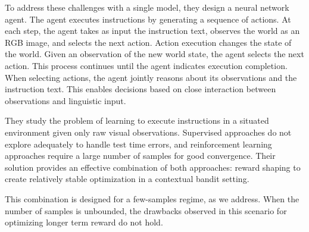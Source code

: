 To address these challenges with a single model, they design a neural network agent. The agent executes instructions by generating a sequence of actions. At each step, the agent takes as input the instruction text, observes the world as an RGB image, and selects the next action. Action execution changes the state of the world. Given an observation of the new world state, the agent selects the next action. This process continues until the agent indicates execution completion. When selecting actions, the agent jointly reasons about its observations and the instruction text. This enables decisions based on close interaction between observations and linguistic input.

They study the problem of learning to execute instructions in a situated environment given only raw visual observations. Supervised approaches do not explore adequately to handle test time errors, and reinforcement learning approaches require a large number of samples for good convergence. Their solution provides an effective combination of both approaches: reward shaping to create relatively stable optimization in a contextual bandit setting.

This combination is designed for a few-samples regime, as we address. When the number of samples is unbounded, the drawbacks observed in this scenario for optimizing longer term reward do not hold.
